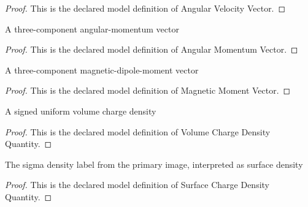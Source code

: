 \begin{proof}
  This is the declared model definition of Angular Velocity Vector.
\end{proof}
\begin{definition}
  \label{def:physics:phyx-mini-0627:phyxminiproblems-problemphyxmini0627-angularmomentumvector}
  A three-component angular-momentum vector
\end{definition}
\begin{proof}
  This is the declared model definition of Angular Momentum Vector.
\end{proof}
\begin{definition}
  \label{def:physics:phyx-mini-0627:phyxminiproblems-problemphyxmini0627-magneticmomentvector}
  A three-component magnetic-dipole-moment vector
\end{definition}
\begin{proof}
  This is the declared model definition of Magnetic Moment Vector.
\end{proof}
\begin{definition}
  \label{def:physics:phyx-mini-0627:phyxminiproblems-problemphyxmini0627-volumechargedensityquantity}
  A signed uniform volume charge density
\end{definition}
\begin{proof}
  This is the declared model definition of Volume Charge Density Quantity.
\end{proof}
\begin{definition}
  \label{def:physics:phyx-mini-0627:phyxminiproblems-problemphyxmini0627-surfacechargedensityquantity}
  The sigma density label from the primary image, interpreted as surface density
\end{definition}
\begin{proof}
  This is the declared model definition of Surface Charge Density Quantity.
\end{proof}
